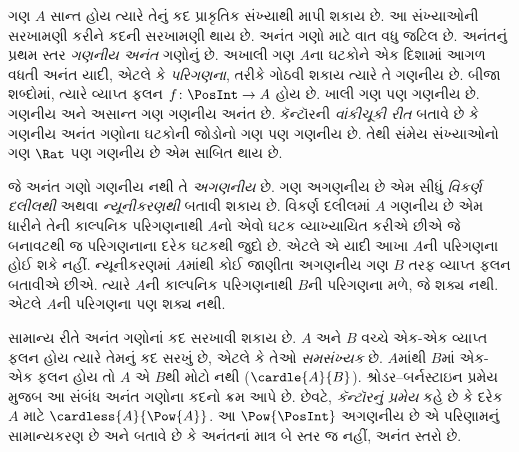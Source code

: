 ગણ $A$ સાન્ત હોય ત્યારે તેનું કદ પ્રાકૃતિક સંખ્યાથી માપી શકાય છે. આ સંખ્યાઓની સરખામણી કરીને કદની સરખામણી થાય છે. અનંત ગણો માટે વાત વધુ જટિલ છે. અનંતનું પ્રથમ સ્તર \emph{ગણનીય અનંત} ગણોનું છે. અખાલી ગણ $A$ના ઘટકોને એક દિશામાં આગળ વધતી અનંત યાદી, એટલે કે \emph{પરિગણના}, તરીકે ગોઠવી શકાય ત્યારે તે ગણનીય છે. બીજા શબ્દોમાં, ત્યારે વ્યાપ્ત ફલન $f\colon\PosInt\to A$ હોય છે. ખાલી ગણ પણ ગણનીય છે. ગણનીય અને અસાન્ત ગણ ગણનીય અનંત છે. કૅન્ટૉરની \emph{વાંકીચૂકી રીત} બતાવે છે કે ગણનીય અનંત ગણોના ઘટકોની જોડોનો ગણ પણ ગણનીય છે. તેથી સંમેય સંખ્યાઓનો ગણ $\Rat$ પણ ગણનીય છે એમ સાબિત થાય છે.

જે અનંત ગણો ગણનીય નથી તે \emph{અગણનીય} છે. ગણ અગણનીય છે એમ સીધું \emph{વિકર્ણ દલીલથી} અથવા \emph{ન્યૂનીકરણથી} બતાવી શકાય છે. વિકર્ણ દલીલમાં $A$ ગણનીય છે એમ ધારીને તેની કાલ્પનિક પરિગણનાથી $A$નો એવો ઘટક વ્યાખ્યાયિત કરીએ છીએ જે બનાવટથી જ પરિગણનાના દરેક ઘટકથી જુદો છે. એટલે એ યાદી આખા $A$ની પરિગણના હોઈ શકે નહીં. ન્યૂનીકરણમાં $A$માંથી કોઈ જાણીતા અગણનીય ગણ $B$ તરફ વ્યાપ્ત ફલન બતાવીએ છીએ. ત્યારે $A$ની કાલ્પનિક પરિગણનાથી $B$ની પરિગણના મળે, જે શક્ય નથી. એટલે $A$ની પરિગણના પણ શક્ય નથી.

સામાન્ય રીતે અનંત ગણોનાં કદ સરખાવી શકાય છે. $A$ અને $B$ વચ્ચે એક-એક વ્યાપ્ત ફલન હોય ત્યારે તેમનું કદ સરખું છે, એટલે કે તેઓ \emph{સમસંખ્યક} છે. $A$માંથી $B$માં એક-એક ફલન હોય તો $A$ એ $B$થી મોટો નથી ($\cardle{A}{B}$). શ્રોડર–બર્નસ્ટાઇન પ્રમેય મુજબ આ સંબંધ અનંત ગણોના કદનો ક્રમ આપે છે. છેવટે, \emph{કૅન્ટૉરનું પ્રમેય} કહે છે કે દરેક $A$ માટે $\cardless{A}{\Pow{A}}$. આ $\Pow{\PosInt}$ અગણનીય છે એ પરિણામનું સામાન્યકરણ છે અને બતાવે છે કે અનંતનાં માત્ર બે સ્તર જ નહીં, અનંત સ્તરો છે.
